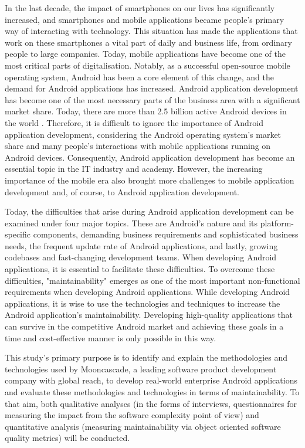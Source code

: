 In the last decade, the impact of smartphones on our lives has significantly increased, and smartphones and mobile applications became people's primary way of interacting with technology. This situation has made the applications that work on these smartphones a vital part of daily and business life, from ordinary people to large companies. Today, mobile applications have become one of the most critical parts of digitalisation. Notably, as a successful open-source mobile operating system, Android has been a core element of this change, and the demand for Android applications has increased. Android application development has become one of the most necessary parts of the business area with a significant market share. Today, there are more than 2.5 billion active Android devices in the world \cite{1} . Therefore, it is difficult to ignore the importance of Android application development, considering the Android operating system's market share and many people's interactions with mobile applications running on Android devices. Consequently, Android application development has become an essential topic in the IT industry and academy. However, the increasing importance of the mobile era also brought more challenges to mobile application development and, of course, to Android application development.

Today, the difficulties that arise during Android application development can be examined under four major topics. These are Android's nature and its platform-specific components, demanding business requirements and sophisticated business needs, the frequent update rate of Android applications, and lastly, growing codebases and fast-changing development teams. When developing Android applications, it is essential to facilitate these difficulties. To overcome these difficulties, "maintainability" emerges as one of the most important non-functional requirements when developing Android applications. While developing Android applications, it is wise to use the technologies and techniques to increase the Android application's maintainability. Developing high-quality applications that can survive in the competitive Android market and achieving these goals in a time and cost-effective manner is only possible in this way.

This study's primary purpose is to identify and explain the methodologies and technologies used by Mooncascade, a leading software product development company with global reach, to develop real-world enterprise Android applications and evaluate these methodologies and technologies in terms of maintainability. To that aim, both qualitative analyses (in the forms of interviews, questionnaires for measuring the impact from the software complexity point of view) and quantitative analysis (measuring maintainability via object oriented software quality metrics) will be conducted.

